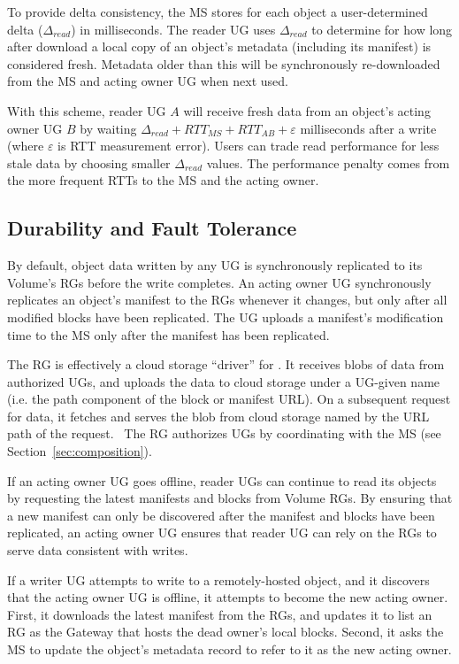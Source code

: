 To provide delta consistency, the MS stores for each object a user-determined delta ($\Delta_{read}$) in milliseconds. The reader UG uses $\Delta_{read}$ to determine for how long after download a local copy of an object's metadata (including its manifest) is considered fresh. Metadata older than this will be synchronously re-downloaded from the MS and acting owner UG when next used.

With this scheme, reader UG $A$ will receive fresh data from an object's acting owner UG $B$ by waiting $\Delta_{read} + RTT_{MS} + RTT_{AB} + \varepsilon$ milliseconds after a write (where $\varepsilon$ is RTT measurement error). Users can trade read performance for less stale data by choosing smaller $\Delta_{read}$ values. The performance penalty comes from the more frequent RTTs to the MS and the acting owner.

\subsection{Durability and Fault Tolerance}

By default, object data written by any UG is synchronously replicated to its Volume's RGs before the write completes. An acting owner UG synchronously replicates an object's manifest to the RGs whenever it changes, but only after all modified blocks have been replicated. The UG uploads a manifest's modification time to the MS only after the manifest has been replicated.

The RG is effectively a cloud storage ``driver'' for \Syndicate. It receives blobs of data from authorized UGs, and uploads the data to cloud storage under a UG-given name (i.e. the path component of the block or manifest URL). On a subsequent request for data, it fetches and serves the blob from cloud storage named by the URL path of the request.  The RG authorizes UGs by coordinating with the MS (see Section~\ref{sec:composition}).

If an acting owner UG goes offline, reader UGs can continue to read its objects by requesting the latest manifests and blocks from Volume RGs. By ensuring that a new manifest can only be discovered after the manifest and blocks have been replicated, an acting owner UG ensures that reader UG can rely on the RGs to serve data consistent with writes.

If a writer UG attempts to write to a remotely-hosted object, and it discovers that the acting owner UG is offline, it attempts to become the new acting owner. First, it downloads the latest manifest from the RGs, and updates it to list an RG as the Gateway that hosts the dead owner's local blocks. Second, it asks the MS to update the object's metadata record to refer to it as the new acting owner.

